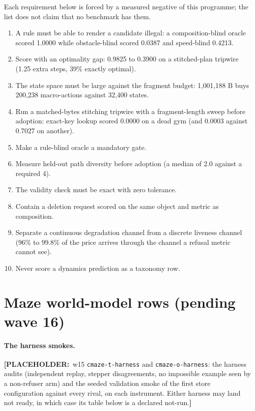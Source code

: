 \documentclass{article} %
\newcommand{\PLACEHOLDER}[1]{{\color{red}\textbf{[PLACEHOLDER:}~#1\textbf{]}}}
\begin{document}
Each requirement below is forced by a measured negative of this programme; the list does not
claim that no benchmark has them. %
\begin{enumerate}[leftmargin=*,itemsep=1pt]
\item A rule must be able to render a candidate illegal: a composition-blind oracle scored 1.0000
  while obstacle-blind scored 0.0387 and speed-blind 0.4213. %
\item Score with an optimality gap: 0.9825 to 0.3900 on a stitched-plan tripwire (1.25 extra steps,
  39\% exactly optimal). %
\item The state space must be large against the fragment budget: 1,001,188 B buys 200,238
  macro-actions against 32,400 states. %
\item Run a matched-bytes stitching tripwire with a fragment-length sweep before adoption: exact-key
  lookup scored 0.0000 on a dead gym (and 0.0003 against 0.7027 on another).
\item Make a rule-blind oracle a mandatory gate.
\item Measure held-out path diversity before adoption (a median of 2.0 against a required 4).
\item The validity check must be exact with zero tolerance.
\item Contain a deletion request scored on the same object and metric as composition.
\item Separate a continuous degradation channel from a discrete liveness channel (96\% to 99.8\% of
  the price arrives through the channel a refusal metric cannot see). %
\item Never score a dynamics prediction as a taxonomy row.
\end{enumerate}

\section{Maze world-model rows (pending wave 16)} %
\label{app:mazewm}

\paragraph{The harness smokes.} \PLACEHOLDER{w15 \texttt{cmaze-t-harness} and
\texttt{cmaze-o-harness}: the harness audits (independent replay, stepper disagreements, no
impossible example seen by a non-refuser arm) and the seeded validation smoke of the first
store configuration against every rival, on each instrument. Either harness may land not
ready, in which case its table below is a declared not-run.}
\end{document}
